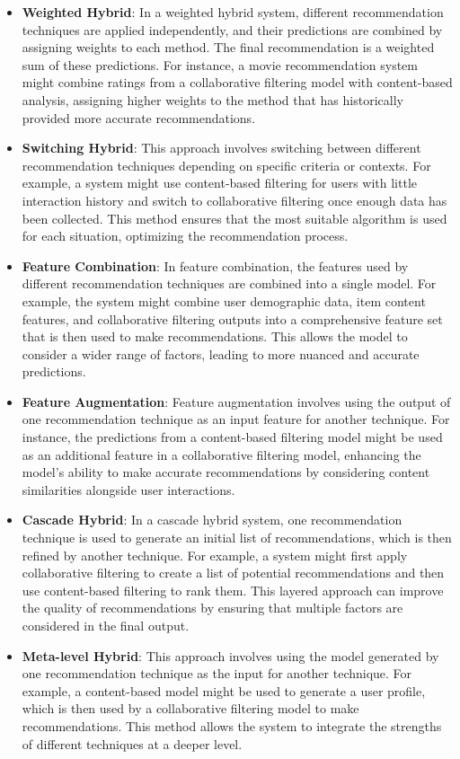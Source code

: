 \documentclass{article}
\begin{document}
\begin{itemize}
    \item \textbf{Weighted Hybrid}: In a weighted hybrid system, different recommendation techniques are applied independently, and their predictions are combined by assigning weights to each method. The final recommendation is a weighted sum of these predictions. For instance, a movie recommendation system might combine ratings from a collaborative filtering model with content-based analysis, assigning higher weights to the method that has historically provided more accurate recommendations.
    \item \textbf{Switching Hybrid}: This approach involves switching between different recommendation techniques depending on specific criteria or contexts. For example, a system might use content-based filtering for users with little interaction history and switch to collaborative filtering once enough data has been collected. This method ensures that the most suitable algorithm is used for each situation, optimizing the recommendation process.
    \item \textbf{Feature Combination}: In feature combination, the features used by different recommendation techniques are combined into a single model. For example, the system might combine user demographic data, item content features, and collaborative filtering outputs into a comprehensive feature set that is then used to make recommendations. This allows the model to consider a wider range of factors, leading to more nuanced and accurate predictions.
    \item \textbf{Feature Augmentation}: Feature augmentation involves using the output of one recommendation technique as an input feature for another technique. For instance, the predictions from a content-based filtering model might be used as an additional feature in a collaborative filtering model, enhancing the model’s ability to make accurate recommendations by considering content similarities alongside user interactions.
    \item \textbf{Cascade Hybrid}: In a cascade hybrid system, one recommendation technique is used to generate an initial list of recommendations, which is then refined by another technique. For example, a system might first apply collaborative filtering to create a list of potential recommendations and then use content-based filtering to rank them. This layered approach can improve the quality of recommendations by ensuring that multiple factors are considered in the final output.
    \item \textbf{Meta-level Hybrid}: This approach involves using the model generated by one recommendation technique as the input for another technique. For example, a content-based model might be used to generate a user profile, which is then used by a collaborative filtering model to make recommendations. This method allows the system to integrate the strengths of different techniques at a deeper level.
\end{itemize}
\end{document}
